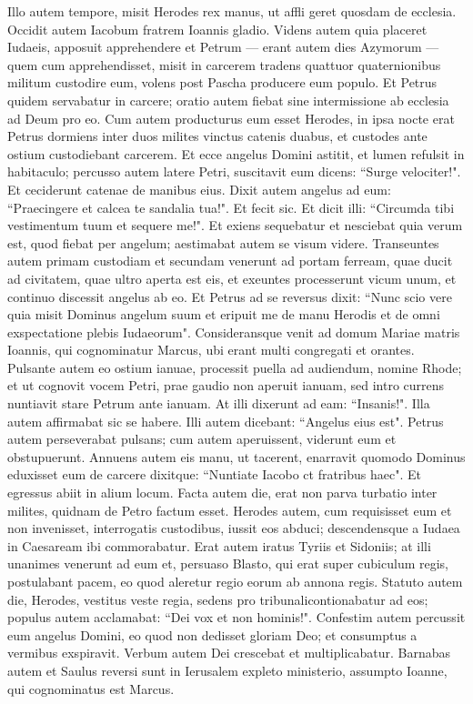 \begin{biblechapter}  
\verse Illo autem tempore, misit Herodes rex manus, ut affli geret quosdam de ecclesia. 
\verse Occidit autem Iacobum fratrem Ioannis gladio. 
\verse Videns autem quia placeret Iudaeis, apposuit apprehendere et Petrum — erant autem dies Azymorum — 
\verse quem cum apprehendisset, misit in carcerem tradens quattuor quaternionibus militum custodire eum, volens post Pascha producere eum populo.  
\verse Et Petrus quidem servabatur in carcere; oratio autem fiebat sine intermissione ab ecclesia ad Deum pro eo. 
\verse Cum autem producturus eum esset Herodes, in ipsa nocte erat Petrus dormiens inter duos milites vinctus catenis duabus, et custodes ante ostium custodiebant carcerem. 
\verse Et ecce angelus Domini astitit, et lumen refulsit in habitaculo; percusso autem latere Petri, suscitavit eum dicens: “Surge velociter!". Et ceciderunt catenae de manibus eius. 
\verse Dixit autem angelus ad eum: “Praecingere et calcea te sandalia tua!". Et fecit sic. Et dicit illi: “Circumda tibi vestimentum tuum et sequere me!". 
\verse Et exiens sequebatur et nesciebat quia verum est, quod fiebat per angelum; aestimabat autem se visum videre. 
\verse Transeuntes autem primam custodiam et secundam venerunt ad portam ferream, quae ducit ad civitatem, quae ultro aperta est eis, et exeuntes processerunt vicum unum, et continuo discessit angelus ab eo. 
\verse Et Petrus ad se reversus dixit: “Nunc scio vere quia misit Dominus angelum suum et eripuit me de manu Herodis et de omni exspectatione plebis Iudaeorum". 
\verse Consideransque venit ad domum Mariae matris Ioannis, qui cognominatur Marcus, ubi erant multi congregati et orantes. 
\verse Pulsante autem eo ostium ianuae, processit puella ad audiendum, nomine Rhode; 
\verse et ut cognovit vocem Petri, prae gaudio non aperuit ianuam, sed intro currens nuntiavit stare Petrum ante ianuam. 
\verse At illi dixerunt ad eam: “Insanis!". Illa autem affirmabat sic se habere. Illi autem dicebant: “Angelus eius est". 
\verse Petrus autem perseverabat pulsans; cum autem aperuissent, viderunt eum et obstupuerunt. 
\verse Annuens autem eis manu, ut tacerent, enarravit quomodo Dominus eduxisset eum de carcere dixitque: “Nuntiate Iacobo ct fratribus haec". Et egressus abiit in alium locum. 
\verse Facta autem die, erat non parva turbatio inter milites, quidnam de Petro factum esset. 
\verse Herodes autem, cum requisisset eum et non invenisset, interrogatis custodibus, iussit eos abduci; descendensque a Iudaea in Caesaream ibi commorabatur. 
\verse Erat autem iratus Tyriis et Sidoniis; at illi unanimes venerunt ad eum et, persuaso Blasto, qui erat super cubiculum regis, postulabant pacem, eo quod aleretur regio eorum ab annona regis. 
\verse Statuto autem die, Herodes, vestitus veste regia, sedens pro tribunalicontionabatur ad eos; 
\verse populus autem acclamabat: “Dei vox et non hominis!". 
\verse Confestim autem percussit eum angelus Domini, eo quod non dedisset gloriam Deo; et consumptus a vermibus exspiravit. 
\verse Verbum autem Dei crescebat et multiplicabatur. 
\verse Barnabas autem et Saulus reversi sunt in Ierusalem expleto ministerio, assumpto Ioanne, qui cognominatus est Marcus. 
\end{biblechapter}

